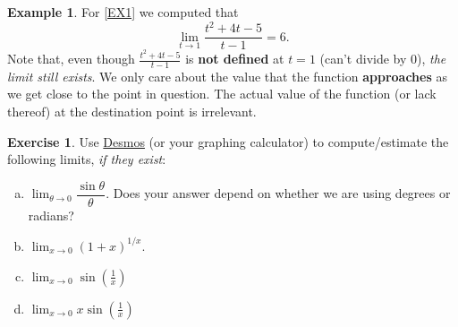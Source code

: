 \documentclass[11pt,reqno,final]{amsart}
\numberwithin{equation}{section}
\numberwithin{figure}{section}
\theoremstyle{definition} %
\newtheorem*{example*}{Example}%
\newtheorem{exercise}[question]{Exercise}
\begin{document}
\begin{example*}
        For \cref{EX1} we computed that
        \[
                \lim_{t \to 1}\dfrac{t^2+4t-5}{t-1} = 6.
        \]
        Note that, even though $\frac{t^2+4t-5}{t-1}$ is \textbf{not defined} at $t = 1$ (can't divide by 0), \textit{the limit still exists}.
        We only care about the value that the function \textbf{approaches} as we get close to the point in question.
        The actual value of the function (or lack thereof) at the destination point is irrelevant.
\end{example*}

\begin{exercise}
        Use \href{https://www.desmos.com/calculator}{Desmos} (or your graphing calculator) to compute/estimate the following limits, \textit{if they exist}:
        \begin{enumerate}[(a)]
        \item $\displaystyle \lim_{\theta \to 0}\dfrac{\sin \theta}{\theta}$.
                Does your answer depend on whether we are using degrees or radians?
                \vfill
        \item $\displaystyle \lim_{x \to 0} {(1+x)}^{1/x}$.
                \vfill
        \item $\displaystyle \lim_{x \to 0} \sin\left(\frac{1}{x}\right)$
                \vfill
        \item $\displaystyle \lim_{x \to 0} x \sin\left(\frac{1}{x}\right)$
                \vfill
        \end{enumerate}
\end{exercise}
\end{document}
